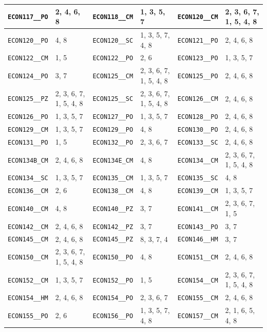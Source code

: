 \begin{longtable}{|l|l||l|l||l|l|}
    \verb|ECON117__PO| & 2, 4, 6, 8 & \verb|ECON118__CM| & 1, 3, 5, 7 & \verb|ECON120__CM| & 2, 3, 6, 7, 1, 5, 4, 8\\\hline
    \verb|ECON120__PO| & 4, 8 & \verb|ECON120__SC| & 1, 3, 5, 7, 4, 8 & \verb|ECON121__PO| & 2, 4, 6, 8\\\hline
    \verb|ECON122__CM| & 1, 5 & \verb|ECON122__PO| & 2, 6 & \verb|ECON123__PO| & 1, 3, 5, 7\\\hline
    \verb|ECON124__PO| & 3, 7 & \verb|ECON125__CM| & 2, 3, 6, 7, 1, 5, 4, 8 & \verb|ECON125__PO| & 2, 4, 6, 8\\\hline
    \verb|ECON125__PZ| & 2, 3, 6, 7, 1, 5, 4, 8 & \verb|ECON125__SC| & 2, 3, 6, 7, 1, 5, 4, 8 & \verb|ECON126__CM| & 2, 4, 6, 8\\\hline
    \verb|ECON126__PO| & 1, 3, 5, 7 & \verb|ECON127__PO| & 1, 3, 5, 7 & \verb|ECON128__PO| & 2, 4, 6, 8\\\hline
    \verb|ECON129__CM| & 1, 3, 5, 7 & \verb|ECON129__PO| & 4, 8 & \verb|ECON130__PO| & 2, 4, 6, 8\\\hline
    \verb|ECON131__PO| & 1, 5 & \verb|ECON132__PO| & 2, 3, 6, 7 & \verb|ECON133__SC| & 2, 4, 6, 8\\\hline
    \verb|ECON134B_CM| & 2, 4, 6, 8 & \verb|ECON134E_CM| & 4, 8 & \verb|ECON134__CM| & 2, 3, 6, 7, 1, 5, 4, 8\\\hline
    \verb|ECON134__SC| & 1, 3, 5, 7 & \verb|ECON135__CM| & 1, 3, 5, 7 & \verb|ECON135__SC| & 4, 8\\\hline
    \verb|ECON136__CM| & 2, 6 & \verb|ECON138__CM| & 4, 8 & \verb|ECON139__CM| & 1, 3, 5, 7\\\hline
    \verb|ECON140__CM| & 4, 8 & \verb|ECON140__PZ| & 3, 7 & \verb|ECON141__CM| & 2, 3, 6, 7, 1, 5\\\hline
    \verb|ECON142__CM| & 2, 4, 6, 8 & \verb|ECON142__PZ| & 3, 7 & \verb|ECON143__PO| & 3, 7\\\hline
    \verb|ECON145__CM| & 2, 4, 6, 8 & \verb|ECON145__PZ| & 8, 3, 7, 4 & \verb|ECON146__HM| & 3, 7\\\hline
    \verb|ECON150__CM| & 2, 3, 6, 7, 1, 5, 4, 8 & \verb|ECON150__PO| & 4, 8 & \verb|ECON151__CM| & 2, 4, 6, 8\\\hline
    \verb|ECON152__CM| & 1, 3, 5, 7 & \verb|ECON152__PO| & 1, 5 & \verb|ECON154__CM| & 2, 3, 6, 7, 1, 5, 4, 8\\\hline
    \verb|ECON154__HM| & 2, 4, 6, 8 & \verb|ECON154__PO| & 2, 3, 6, 7 & \verb|ECON155__CM| & 2, 4, 6, 8\\\hline
    \verb|ECON155__PO| & 2, 6 & \verb|ECON156__PO| & 1, 3, 5, 7, 4, 8 & \verb|ECON157__CM| & 2, 1, 6, 5, 4, 8\\\hline

\end{longtable}
